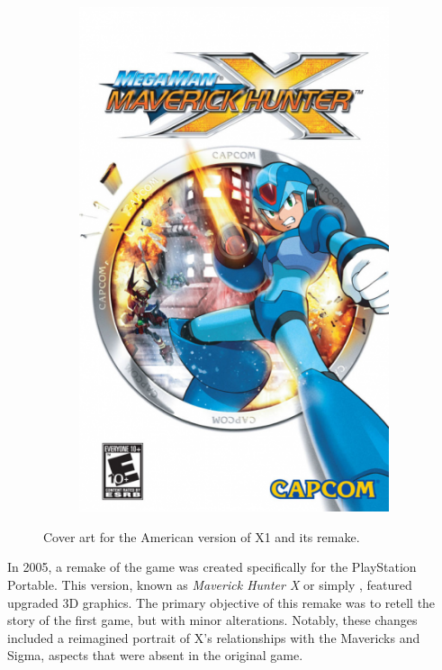 \begin{figure}[htp]
\begin{subfigure}[c]{0.4\linewidth}
		\includegraphics[width=\linewidth]{figures/X1/mmxmh.png}
	\end{subfigure}
	\caption{Cover art for the American version of X1 and its remake.}
\end{figure}
In 2005, a remake of the game was created specifically for the PlayStation Portable. This version, known as \textit{Maverick Hunter X} or simply \mhx, featured upgraded 3D graphics. The primary objective of this remake was to retell the story of the first game, but with minor alterations. Notably, these changes included a reimagined portrait of X's relationships with the Mavericks and Sigma, aspects that were absent in the original game.

